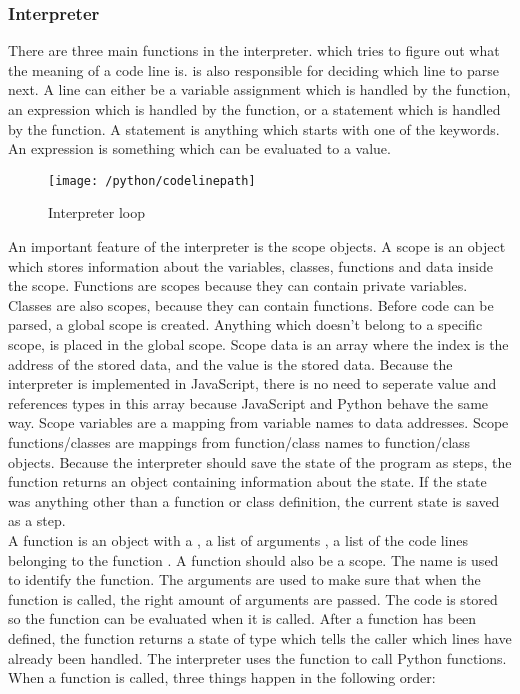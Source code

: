 \subsubsection{Interpreter}
There are three main functions in the interpreter.  which tries to figure out what the meaning of a code line is.  is also responsible for deciding which line to parse next. A line can either be a variable assignment which is handled  by the  function, an expression which is handled by the  function, or a statement which is handled by the  function. A statement is anything which starts with one of the keywords. An expression is something which can be evaluated to a value.
\begin{figure}[H]
    \centering
    \texttt{[image: /python/codelinepath]}
    \caption{Interpreter loop}
    \label{fig:pythonCodeLinePath}
\end{figure}
An important feature of the interpreter is the scope objects. A scope is an object which stores information about the variables, classes, functions and data inside the scope. Functions are scopes because they can contain private variables. Classes are also scopes, because they can contain functions. Before code can be parsed, a global scope is created. Anything which doesn't belong to a specific scope, is placed in the global scope. Scope data is an array where the index is the address of the stored data, and the value is the stored data. Because the interpreter is implemented in JavaScript, there is no need to seperate value and references types in this array because JavaScript and Python behave the same way. Scope variables are a mapping from variable names to data addresses. Scope functions/classes are mappings from function/class names to function/class objects. Because the interpreter should save the state of the program as steps, the  function returns an object containing information about the state. If the state was anything other than a function or class definition, the current state is saved as a step.
\\[11pt]
A function is an object with a , a list of arguments , a list of the code lines belonging to the function . A function should also be a scope. The name is used to identify the function. The arguments are used to make sure that when the function is called, the right amount of arguments are passed. The code is stored so the function can be evaluated when it is called. After a function has been defined, the  function returns a state of type  which tells the caller which lines have already been handled. The interpreter uses the  function to call Python functions. When a function is called, three things happen in the following order:
